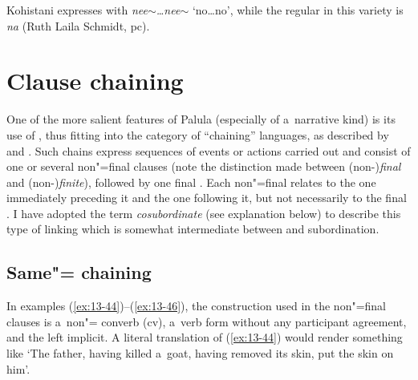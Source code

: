 Kohistani \iliShina expresses  with \textit{nee$\sim${\ldots}nee$\sim$} `no{\ldots}no', while the regular   in this variety is \textit{na} (Ruth Laila Schmidt, pc).


\section{Clause chaining}
\label{sec:13-3}

One of the more salient features of Palula  (especially of a~narrative kind) is its use of , thus fitting into the category of ``chaining'' languages, as described by \citet[242]{thompsonetal2007} and \citet[374--376]{longacre2007}. Such  chains express sequences of events or actions carried out and consist of one or several non"=final clauses (note the distinction made between (non-)\textit{final} and (non-)\textit{finite}), followed by one final . Each non"=final  relates to the one immediately preceding it and the one following it, but not necessarily to the final . I have adopted the term \textit{cosubordinate} (see explanation below) to describe this type of  linking which is somewhat intermediate between  and subordination.


\subsection{Same"= chaining}
\label{subsec:13-3-1}

In examples (\ref{ex:13-44})--(\ref{ex:13-46}), the construction used in the non"=final clauses is a~non"= converb (cv), a~verb form without any participant agreement, and the  left implicit. A literal translation of (\ref{ex:13-44}) would render something like `The father, having killed a~goat, having removed its skin, put the skin on him'. 

